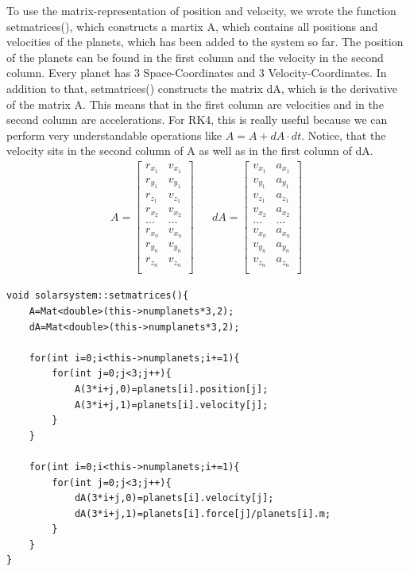 \documentclass[10pt,a4paper]{article}
\begin{document}
To use the matrix-representation of position and velocity, we wrote the function setmatrices(), which constructs a martix A, which contains all positions and velocities of the planets, which has been added to the system so far. The position of the planets can be found in the first column and the velocity in the second column. Every planet has 3 Space-Coordinates and 3 Velocity-Coordinates. In addition to that, setmatrices() constructs the matrix dA, which is the derivative of the matrix A. This means that in the first column are velocities and in the second column are accelerations. For RK4, this is really useful because we can perform very understandable operations like $A=A+dA \cdot dt $.
Notice, that the velocity sits in the second column of A as well as in the first column of dA.
\begin{align}
A=
\begin{bmatrix}
r_{x_1} & v_{x_1}\\
r_{y_1} & v_{y_1} \\
r_{z_1} & v_{z_1} \\
r_{x_2} & v_{x_2} \\
... & ... \\
r_{x_n} & v_{x_n}\\
r_{y_n} & v_{y_n} \\
r_{z_n} & v_{z_n} \\
\end{bmatrix}
& &
dA=
\begin{bmatrix}
v_{x_1} & a_{x_1}\\
v_{y_1} & a_{y_1} \\
v_{z_1} & a_{z_1} \\
v_{x_2} & a_{x_2} \\
... & ... \\
v_{x_n} & a_{x_n}\\
v_{y_n} & a_{y_n} \\
v_{z_n} & a_{z_n} \\
\end{bmatrix}
\end{align}
\begin{lstlisting}
void solarsystem::setmatrices(){
    A=Mat<double>(this->numplanets*3,2);
    dA=Mat<double>(this->numplanets*3,2);
    
    for(int i=0;i<this->numplanets;i+=1){
        for(int j=0;j<3;j++){
            A(3*i+j,0)=planets[i].position[j];
            A(3*i+j,1)=planets[i].velocity[j];
        }
    }
    
    for(int i=0;i<this->numplanets;i+=1){
        for(int j=0;j<3;j++){
            dA(3*i+j,0)=planets[i].velocity[j];
            dA(3*i+j,1)=planets[i].force[j]/planets[i].m;
        }
    }
}
\end{lstlisting}
\end{document}
